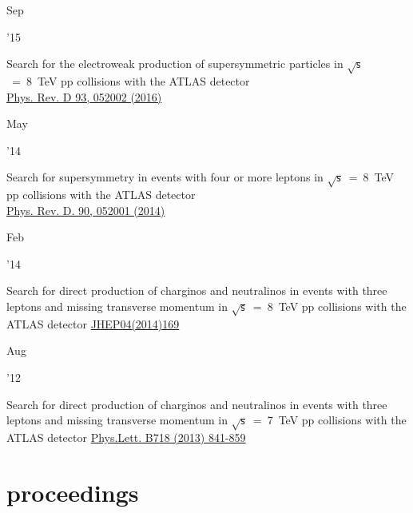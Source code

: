 \documentclass[]{cv} %
\begin{document}
  \begin{entrylist}

  \entry
  {\parbox[t]{\parboxWidthOne}{Sep}\parbox[t]{\parboxWidthTwo}{\hfill '15}}
  {Search for the electroweak production of supersymmetric particles in
    $\sqrt{\mathsf{s}}$~=~8~TeV pp collisions with the ATLAS detector\\}
    {\href{https://journals.aps.org/prd/abstract/10.1103/PhysRevD.93.052002}{Phys. Rev. D 93, 052002 (2016)}}
  {\vspace*{\spacingPubs}}

  \entry
  {\parbox[t]{\parboxWidthOne}{May}\parbox[t]{\parboxWidthTwo}{\hfill '14}}
  {Search for supersymmetry in events with four or more leptons in $\sqrt{\mathsf{s}}$~=~8~TeV pp collisions with the ATLAS detector\\}
  {\href{https://journals.aps.org/prd/abstract/10.1103/PhysRevD.90.052001}{Phys. Rev. D. 90, 052001 (2014)}}
  {\vspace*{\spacingPubs}}

  \entry
  {\parbox[t]{\parboxWidthOne}{Feb}\parbox[t]{\parboxWidthTwo}{\hfill '14}}
  {Search for direct production of charginos and neutralinos in events with three leptons and missing transverse momentum in $\sqrt{\mathsf{s}}$~=~8~TeV pp collisions with the ATLAS detector}
{\href{https://link.springer.com/article/10.1007\%2FJHEP04\%282014\%29169}{JHEP04(2014)169}}
{\vspace*{\spacingPubs}}

    \entry
    {\parbox[t]{\parboxWidthOne}{Aug}\parbox[t]{\parboxWidthTwo}{\hfill '12}}
    {Search for direct production of charginos and neutralinos in events with three leptons and missing transverse momentum in $\sqrt{\mathsf{s}}$~=~7~TeV pp collisions with the ATLAS detector}
  {\href{https://www.sciencedirect.com/science/article/pii/S037026931201204X?via\%3Dihub}{Phys.Lett. B718 (2013) 841-859}}
  {\vspace*{\spacingPubs}}

\end{entrylist}

\section{proceedings}
\end{document}
